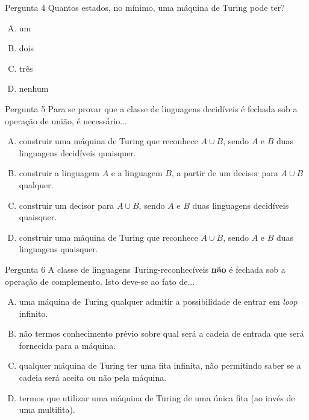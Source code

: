 \documentclass[xcolor=dvipsnames,table]{beamer}
\begin{document}
	\begin{frame}
		\begin{block}{Pergunta 4}
			Quantos estados, no mínimo, uma máquina de Turing pode ter?
		\end{block}
		\begin{enumerate}[(A)]
			\item um
			\item dois
			\item três
			\item nenhum
		\end{enumerate}
	\end{frame}

	\begin{frame}
		\begin{block}{Pergunta 5}
			Para se provar que a classe de linguagens decidíveis é fechada sob a operação de união, é necessário...
		\end{block}
		\begin{enumerate}[(A)]
			\item construir uma máquina de Turing que reconhece $A \cup B$, sendo $A$ e $B$ duas linguagens decidíveis quaisquer.
			\item construir a linguagem $A$ e a linguagem $B$, a partir de um decisor para $A \cup B$ qualquer.
			\item construir um decisor para $A \cup B$, sendo $A$ e $B$ duas linguagens decidíveis quaisquer.
			\item construir uma máquina de Turing que reconhece $A \cup B$, sendo $A$ e $B$ duas linguagens quaisquer.
		\end{enumerate}
	\end{frame}

	\begin{frame}
		\begin{block}{Pergunta 6}
			A classe de linguagens Turing-reconhecíveis {\bf não} é fechada sob a operação de complemento. Isto deve-se ao fato de...
		\end{block}
		\begin{enumerate}[(A)]
			\item uma máquina de Turing qualquer admitir a possibilidade de entrar em {\it loop} infinito.
			\item não termos conhecimento prévio sobre qual será a cadeia de entrada que será fornecida para a máquina.
			\item qualquer máquina de Turing ter uma fita infinita, não permitindo saber se a cadeia será aceita ou não pela máquina.
			\item termos que utilizar uma máquina de Turing de uma única fita (ao invés de uma multifita).
		\end{enumerate}
	\end{frame}
\end{document}
